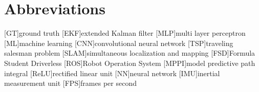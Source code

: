 \chapter{Abbreviations}

\begin{acronym}[AAPC]
	[GT]{ground truth}
	[EKF]{extended Kalman filter}
	[MLP]{multi layer perceptron}
	[ML]{machine learning}
	[CNN]{convolutional neural network}
	[TSP]{traveling salesman problem}
	[SLAM]{simultaneous localization and mapping}
	[FSD]{Formula Student Driverless}
	[ROS]{Robot Operation System}
	[MPPI]{model predictive path integral}
	[ReLU]{rectified linear unit}
	[NN]{neural network}
	[IMU]{inertial measurement unit}
	[FPS]{frames per second}

\end{acronym}